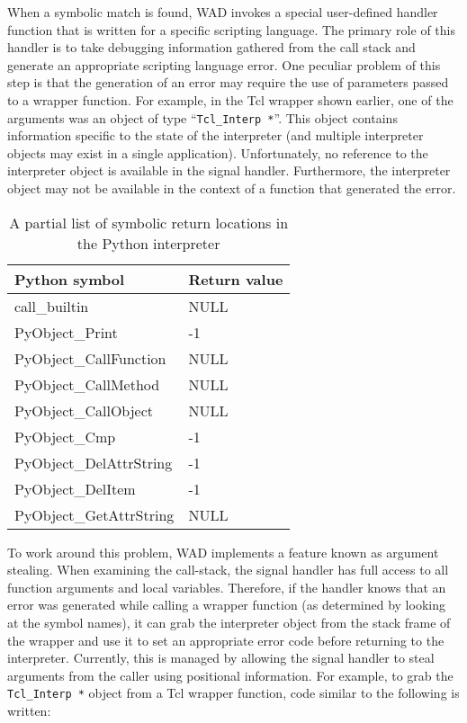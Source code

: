 When a symbolic match is found, WAD invokes a special user-defined
handler function that is written for a specific scripting language.
The primary role of this handler is to take debugging information
gathered from the call stack and generate an appropriate scripting language error.
One peculiar problem of this step is that the generation
of an error may require the use of parameters passed to a
wrapper function.  For example, in the Tcl wrapper shown earlier, one
of the arguments was an object of type ``{\tt Tcl\_Interp *}''.
This object contains information specific to the state of the
interpreter (and multiple interpreter objects may exist in a single
application).   Unfortunately, no reference to the interpreter object is
available in the signal handler.  Furthermore, the interpreter 
object may not be available in the context of a function that generated the error.


\begin{table}[t]
\begin{center}
\begin{tabular}{ll}
Python symbol                 &   Return value \\ \hline
call\_builtin                 &   NULL \\
PyObject\_Print               & -1 \\
PyObject\_CallFunction        & NULL \\
PyObject\_CallMethod          & NULL \\
PyObject\_CallObject          & NULL \\
PyObject\_Cmp                 & -1 \\
PyObject\_DelAttrString       & -1 \\
PyObject\_DelItem             & -1 \\
PyObject\_GetAttrString       & NULL \\
\end{tabular}
\end{center}
\label{returnpoints}
\caption{A partial list of symbolic return locations in the Python interpreter}
\end{table}

To work around this problem, WAD implements a feature
known as argument stealing.  When examining the call-stack, the signal
handler has full access to all function arguments and local variables.
Therefore, if the handler knows that an error was generated while
calling a wrapper function (as determined by looking at the symbol names),
it can grab the interpreter object from the stack frame of the wrapper and
use it to set an appropriate error code before returning to the interpreter.
Currently, this is managed by allowing the signal handler to steal
arguments from the caller using positional information.
For example, to grab the {\tt Tcl\_Interp *} object from a Tcl wrapper function,
code similar to the following is written:

